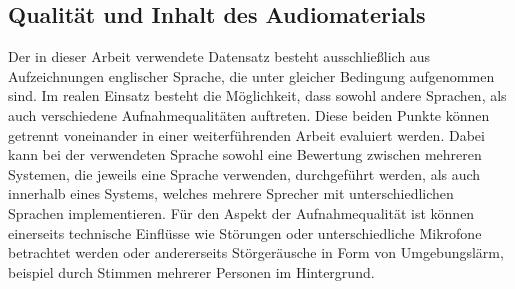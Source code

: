 \subsection{Qualität und Inhalt des Audiomaterials}
Der in dieser Arbeit verwendete Datensatz besteht ausschließlich aus Aufzeichnungen englischer Sprache, die unter gleicher Bedingung aufgenommen sind.
Im realen Einsatz besteht die Möglichkeit, dass sowohl andere Sprachen, als auch verschiedene Aufnahmequalitäten auftreten.
Diese beiden Punkte können getrennt voneinander in einer weiterführenden Arbeit evaluiert werden.
Dabei kann bei der verwendeten Sprache sowohl eine Bewertung zwischen mehreren Systemen, die jeweils eine Sprache verwenden, durchgeführt werden, als auch innerhalb eines Systems, welches mehrere Sprecher mit unterschiedlichen Sprachen implementieren.
Für den Aspekt der Aufnahmequalität ist können einerseits technische Einflüsse wie Störungen oder unterschiedliche Mikrofone betrachtet werden oder andererseits Störgeräusche in Form von Umgebungslärm, beispiel durch Stimmen mehrerer Personen im Hintergrund.
